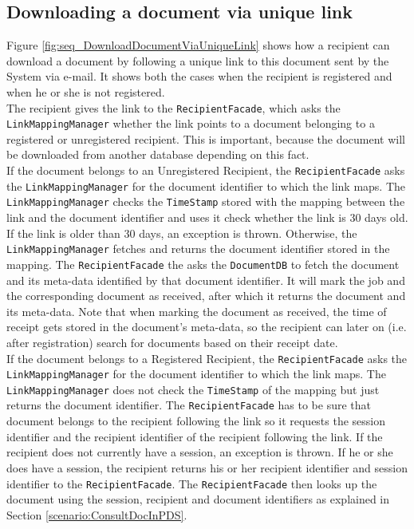 \documentclass[a4paper,10pt]{article}
\begin{document}
\subsection{Downloading a document via unique link}
\label{scenario:DownloadDocUniqueLink}
Figure \ref{fig:seq_DownloadDocumentViaUniqueLink} shows how a recipient can download a document by following a unique link to this document sent by the System via e-mail. It shows both the cases when the recipient is registered and when he or she is not registered.\\ The recipient gives the link to the \texttt{RecipientFacade}, which asks the \texttt{LinkMappingManager} whether the link points to a document belonging to a registered or unregistered recipient. This is important, because the document will be downloaded from another database depending on this fact.\\
If the document belongs to an Unregistered Recipient, the \texttt{RecipientFacade} asks the \texttt{LinkMappingManager} for the document identifier to which the link maps. The \texttt{LinkMappingManager} checks the \texttt{TimeStamp} stored with the mapping between the link and the document identifier and uses it check whether the link is 30 days old. If the link is older than 30 days, an exception is thrown. Otherwise, the \texttt{LinkMappingManager} fetches and returns the document identifier stored in the mapping.  The \texttt{RecipientFacade} the asks the \texttt{DocumentDB} to fetch the document and its meta-data identified by that document identifier. It will mark the job and the corresponding document as received, after which it returns the document and its meta-data. Note that when marking the document as received, the time of receipt gets stored in the document's meta-data, so the recipient can later  on (i.e. after registration) search for documents based on their receipt date.\\
If the document belongs to a Registered Recipient, the \texttt{RecipientFacade} asks the \texttt{LinkMappingManager} for the document identifier to which the link maps. The \texttt{LinkMappingManager} does not check the \texttt{TimeStamp} of the mapping but just returns the document identifier. The \texttt{RecipientFacade} has to be sure that document belongs to the recipient following the link so it requests the session identifier and the recipient identifier of the recipient following the link. If the recipient does not currently have a session, an exception is thrown. If he or she does have a session, the recipient returns his or her recipient identifier and session identifier to the \texttt{RecipientFacade}. The \texttt{RecipientFacade} then looks up the document using the session, recipient and document identifiers as explained in Section \ref{scenario:ConsultDocInPDS}.
\end{document}
